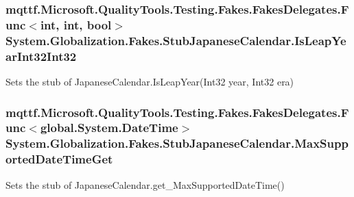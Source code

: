 \hypertarget{class_system_1_1_globalization_1_1_fakes_1_1_stub_japanese_calendar_a3cf93b52b90cd9e36d9d6d2b6b4292cf}{
\subsubsection[{Is\-Leap\-Year\-Int32\-Int32}]{\setlength{\rightskip}{0pt plus 5cm}mqttf.\-Microsoft.\-Quality\-Tools.\-Testing.\-Fakes.\-Fakes\-Delegates.\-Func$<$int, int, bool$>$ System.\-Globalization.\-Fakes.\-Stub\-Japanese\-Calendar.\-Is\-Leap\-Year\-Int32\-Int32}}\label{class_system_1_1_globalization_1_1_fakes_1_1_stub_japanese_calendar_a3cf93b52b90cd9e36d9d6d2b6b4292cf}


Sets the stub of Japanese\-Calendar.\-Is\-Leap\-Year(\-Int32 year, Int32 era)

\hypertarget{class_system_1_1_globalization_1_1_fakes_1_1_stub_japanese_calendar_a1e565991c545d6f099849c8d8c14e859}{
\subsubsection[{Max\-Supported\-Date\-Time\-Get}]{\setlength{\rightskip}{0pt plus 5cm}mqttf.\-Microsoft.\-Quality\-Tools.\-Testing.\-Fakes.\-Fakes\-Delegates.\-Func$<$global.\-System.\-Date\-Time$>$ System.\-Globalization.\-Fakes.\-Stub\-Japanese\-Calendar.\-Max\-Supported\-Date\-Time\-Get}}\label{class_system_1_1_globalization_1_1_fakes_1_1_stub_japanese_calendar_a1e565991c545d6f099849c8d8c14e859}


Sets the stub of Japanese\-Calendar.\-get\-\_\-\-Max\-Supported\-Date\-Time()

